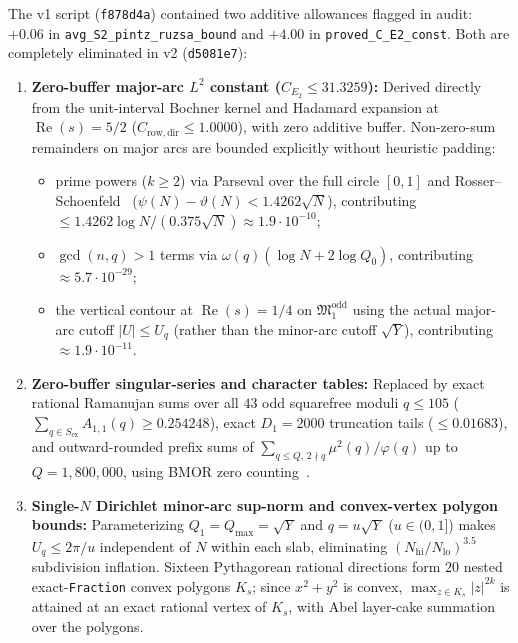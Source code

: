 \documentclass[11pt,a4paper]{article}
\begin{document}
The v1 script (\texttt{f878d4a}) contained two additive allowances flagged in audit: $+0.06$ in \texttt{avg\_S2\_pintz\_ruzsa\_bound} and $+4.00$ in \texttt{proved\_C\_E2\_const}. Both are completely eliminated in v2 (\texttt{d5081e7}):
\begin{enumerate}[leftmargin=2em,itemsep=3pt]
  \item \textbf{Zero-buffer major-arc $L^2$ constant ($C_{E_2} \le 31.3259$):} Derived directly from the unit-interval Bochner kernel and Hadamard expansion at $\operatorname{Re}(s) = 5/2$ ($C_{\mathrm{row,dir}} \le 1.0000$), with zero additive buffer. Non-zero-sum remainders on major arcs are bounded explicitly without heuristic padding:
  \begin{itemize}[leftmargin=1.5em,itemsep=1pt]
    \item prime powers ($k \ge 2$) via Parseval over the full circle $[0,1]$ and Rosser--Schoenfeld~\cite[Theorem~13]{RS1962} ($\psi(N) - \vartheta(N) < 1.4262\sqrt{N}$), contributing $\le 1.4262\log N / (0.375\sqrt{N}) \approx 1.9\cdot 10^{-10}$;
    \item $\gcd(n,q) > 1$ terms via $\omega(q)(\log N + 2\log Q_0)$, contributing $\approx 5.7\cdot 10^{-29}$;
    \item the vertical contour at $\operatorname{Re}(s) = 1/4$ on $\mathfrak{M}_1^{\mathrm{odd}}$ using the actual major-arc cutoff $|U| \le U_q$ (rather than the minor-arc cutoff $\sqrt{Y}$), contributing $\approx 1.9\cdot 10^{-11}$.
  \end{itemize}
  \item \textbf{Zero-buffer singular-series and character tables:} Replaced by exact rational Ramanujan sums over all $43$ odd squarefree moduli $q \le 105$ ($\sum_{q \in S_{\mathrm{ex}}} A_{1,1}(q) \ge 0.254248$), exact $D_1 = 2000$ truncation tails ($\le 0.01683$), and outward-rounded prefix sums of $\sum_{q \le Q,\, 2 \nmid q} \mu^2(q)/\varphi(q)$ up to $Q = 1{,}800{,}000$, using BMOR zero counting~\cite{BMOR2021}.
  \item \textbf{Single-$N$ Dirichlet minor-arc sup-norm and convex-vertex polygon bounds:} Parameterizing $Q_1 = Q_{\max} = \sqrt{Y}$ and $q = u\sqrt{Y}$ ($u \in (0,1]$) makes $U_q \le 2\pi / u$ independent of $N$ within each slab, eliminating $(N_{\mathrm{hi}}/N_{\mathrm{lo}})^{3.5}$ subdivision inflation. Sixteen Pythagorean rational directions form $20$ nested exact-\texttt{Fraction} convex polygons $K_s$; since $x^2 + y^2$ is convex, $\max_{z \in K_s} |z|^{2k}$ is attained at an exact rational vertex of $K_s$, with Abel layer-cake summation over the polygons.
\end{enumerate}
\end{document}
